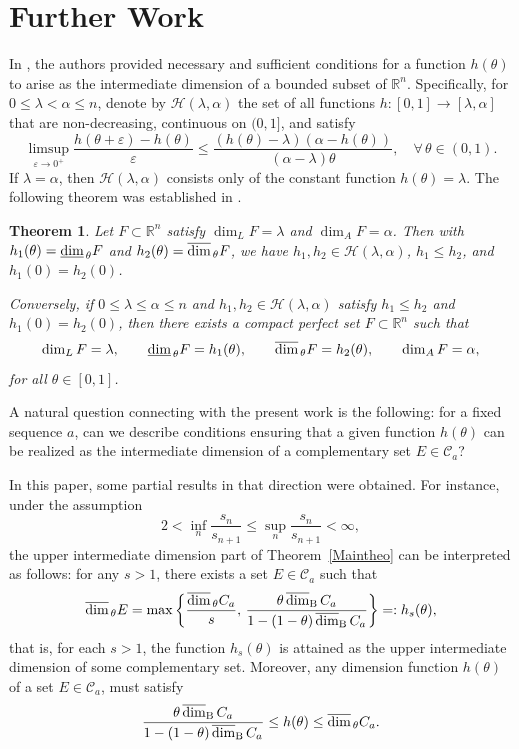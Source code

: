 \documentclass[11pt,reqno,bookmarksnumbered,raiselinks,breaklinks,colorlinks,plainpages]{amsart}
\renewcommand{\epsilon}{\varepsilon}
\newcommand\ubd{\overline{\mbox{\rm dim}}_{\rm B}\,} %
\newcommand\da{\underline{\mbox{\rm dim}}_{\,\theta}} %
\newcommand\uda{\overline{\mbox{\rm dim}}_{\,\theta}} %
\newtheorem{theo}{Theorem}[section]
\begin{document}
\section*{Further Work}

In \cite{Banaji-R22}, the authors provided necessary and sufficient conditions for a function $h(\theta)$ to arise as the intermediate dimension of a bounded subset of $\mathbb{R}^n$. Specifically, for $0 \leq \lambda < \alpha \leq n$, denote by $\mathcal{H}(\lambda,\alpha)$ the set of all functions $h:[0,1]\to [\lambda,\alpha]$ that are non-decreasing, continuous on $(0,1]$, and satisfy
\[
\limsup_{\epsilon\to 0^+}\frac{h(\theta+\epsilon)-h(\theta)}{\epsilon}\leq \frac{(h(\theta)-\lambda)(\alpha - h(\theta))}{(\alpha-\lambda)\theta}, \quad \forall\, \theta\in (0,1).
\]
If $\lambda = \alpha$, then $\mathcal{H}(\lambda,\alpha)$ consists only of the constant function $h(\theta)=\lambda$.  
The following theorem was established in \cite{Banaji-R22}.

\begin{theo}\cite[Theorem B]{Banaji-R22}\label{BanajiRutar}
Let $F\subset \mathbb{R}^n$ satisfy $\dim_L F=\lambda$ and $\dim_A F=\alpha$. Then with $h_1(\theta)=\da F$ and $h_2(\theta)=\uda F$, we have $h_1,h_2\in \mathcal{H}(\lambda,\alpha)$, $h_1\leq h_2$, and $h_1(0)=h_2(0)$.  

Conversely, if $0\leq \lambda\leq \alpha\leq n$ and $h_1,h_2\in \mathcal{H}(\lambda,\alpha)$ satisfy $h_1\leq h_2$ and $h_1(0)=h_2(0)$, then there exists a compact perfect set $F\subset \mathbb{R}^n$ such that
\[
\dim_L F=\lambda,\qquad 
\da F=h_1(\theta),\qquad 
\uda F=h_2(\theta),\qquad 
\dim_A F=\alpha,
\]
for all $\theta\in[0,1]$.
\end{theo}

A natural question connecting \cite{Banaji-R22} with the present work is the following:  
for a fixed sequence $a$, can we describe conditions ensuring that a given function $h(\theta)$ can be realized as the intermediate dimension of a complementary set $E\in \mathcal{C}_a$?  

In this paper, some partial results in that direction were obtained. For instance, under the assumption 
\[
2<\inf_n \frac{s_n}{s_{n+1}}\leq \sup_n \frac{s_n}{s_{n+1}}<\infty,
\]
the upper intermediate dimension part of Theorem~\ref{Maintheo} can be interpreted as follows:  
for any $s>1$, there exists a set $E\in \mathcal{C}_a$ such that
\[
\uda E=\max \left\{ \frac{\uda C_a}{s},\,
\frac{\theta\,\ubd C_a}{1-(1-\theta)\,\ubd C_a} \right\}
=:h_s(\theta),
\]
that is, for each $s>1$, the function $h_s(\theta)$ is attained as the upper intermediate dimension of some complementary set.
Moreover, any dimension function $h(\theta)$ of a set $E\in \mathcal{C}_a$, must satisfy
\[
\frac{\theta\,\ubd C_a}{1-(1-\theta)\,\ubd C_a}\leq h(\theta)\leq \uda C_a.
\]
\end{document}

